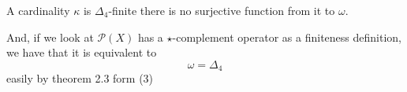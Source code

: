 	\begin{definition}
		A cardinality $\kappa$ is $\Delta_4$-finite
		there is no surjective function from it to $\omega$.
	\end{definition}
	
	And, if we look at $\mathcal{P}(X)$ has a $\star$-complement operator as a finiteness definition, we have that it is equivalent to $$\omega=\Delta_4$$ easily by theorem 2.3 form (3)
	
	\medskip
	
	
	





